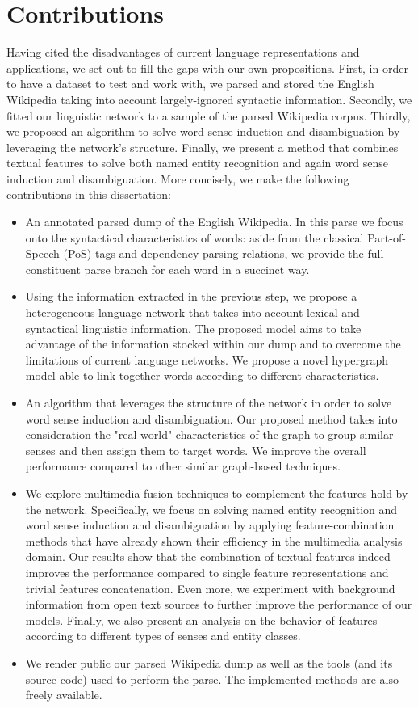 \section{Contributions}
Having cited the disadvantages of current language representations and applications, we set out to fill the gaps with our own propositions. First, in order to have a dataset to test and work with, we parsed and stored the English Wikipedia taking into account largely-ignored syntactic information. Secondly, we fitted our linguistic network to a sample of the parsed Wikipedia corpus. Thirdly, we proposed an algorithm to solve word sense induction and disambiguation by leveraging the network's structure. Finally, we present a method that combines textual features to solve both named entity recognition and again word sense induction and disambiguation. More concisely, we make the following contributions in this dissertation:
\begin{itemize}
\item An annotated parsed dump of the English Wikipedia. In this parse we focus  onto the syntactical characteristics of words: aside from the classical Part-of-Speech (PoS) tags and dependency parsing relations, we provide the full constituent parse branch for each word in a succinct way.  
\item Using the information extracted in the previous step, we propose a heterogeneous language network that takes into account lexical and syntactical linguistic information. The proposed model aims to take advantage of the information stocked within our dump and to overcome the limitations of current language networks. We propose a novel hypergraph model able to link together words according to different characteristics. 
\item An algorithm that leverages  the structure of the network in order to solve word sense induction and disambiguation. Our proposed method takes into consideration the "real-world" characteristics of the graph to group similar senses and then assign them to target words. We  improve the overall performance compared to other similar graph-based techniques.
\item We explore multimedia fusion techniques to complement the features hold by the network. Specifically, we focus on solving named entity recognition and word sense induction and disambiguation by applying feature-combination methods that have already shown their efficiency in the multimedia analysis domain.  Our results show that the combination of textual features indeed improves the performance compared to single feature representations and trivial features concatenation. Even more, we experiment with background information from open text sources to further improve the performance of our models. Finally, we also present an analysis on the behavior of features according to different types of senses and entity classes.


\item   We render public our parsed Wikipedia dump as well as the tools (and its source code) used to perform the parse. The implemented methods are also freely available.


\end{itemize}

